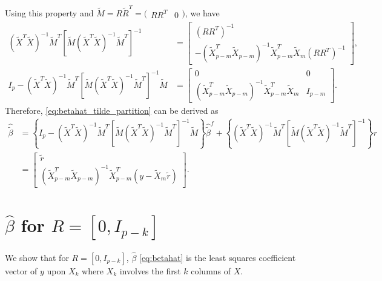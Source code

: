 Using this property and $\tilde{M} = R \tilde{R}^T = \big(\begin{smallmatrix}
  RR^T & 0
\end{smallmatrix}\big)$, we have
\begin{equation*}
\begin{aligned}
\left(\tilde{X}^T \tilde{X}\right)^{-1} \tilde{M}^T \left[ \tilde{M} \left( \tilde{X}^T \tilde{X} \right)^{-1} \tilde{M}^T \right]^{-1} &= 
\begin{bmatrix}
(RR^T)^{-1} \\
-\left(\tilde{X}_{p-m}^T \tilde{X}_{p-m} \right)^{-1} \tilde{X}_{p-m}^T \tilde{X}_m (RR^T)^{-1}
\end{bmatrix},
 \\ 
I_p - \left(\tilde{X}^T \tilde{X}\right)^{-1} \tilde{M}^T \left[ \tilde{M} \left( \tilde{X}^T \tilde{X} \right)^{-1} \tilde{M}^T \right]^{-1} \tilde{M} &= 
\begin{bmatrix}
0 & 0\\
\left(\tilde{X}_{p-m}^T \tilde{X}_{p-m} \right)^{-1} \tilde{X}_{p-m}^T \tilde{X}_m & I_{p-m}
\end{bmatrix}.
\end{aligned}
\end{equation*}
Therefore, \eqref{eq:betahat_tilde_partition} can be derived as
\begin{equation*}
\begin{aligned}
\hat{\tilde{\beta}} &= \left\{I_p - \left(\tilde{X}^T \tilde{X}\right)^{-1} \tilde{M}^T \left[ \tilde{M} \left( \tilde{X}^T \tilde{X} \right)^{-1} \tilde{M}^T \right]^{-1} \tilde{M} \right\}\hat{\tilde{\beta}}^f + \left\{\left(\tilde{X}^T \tilde{X}\right)^{-1} \tilde{M}^T \left[ \tilde{M} \left( \tilde{X}^T \tilde{X} \right)^{-1} \tilde{M}^T \right]^{-1} \right\}r\\
&=
\begin{bmatrix}
\tilde{r}\\
\left(\tilde{X}_{p-m}^T \tilde{X}_{p-m} \right)^{-1} \tilde{X}_{p-m}^T \left(y - \tilde{X}_m \tilde{r}\right)
\end{bmatrix}.
\end{aligned}
\end{equation*}


\iffalse
\section{\texorpdfstring{$\hat{\beta}$}{} for \texorpdfstring{$R=[0, I_{p-k}]$}{} }
We show that for $R=[0, I_{p-k}]$, $\hat{\beta}$ \eqref{eq:betahat} is the least squares coefficient vector of $y$ upon $X_k$ where $X_k$ involves the first $k$ columns of $X$. 

